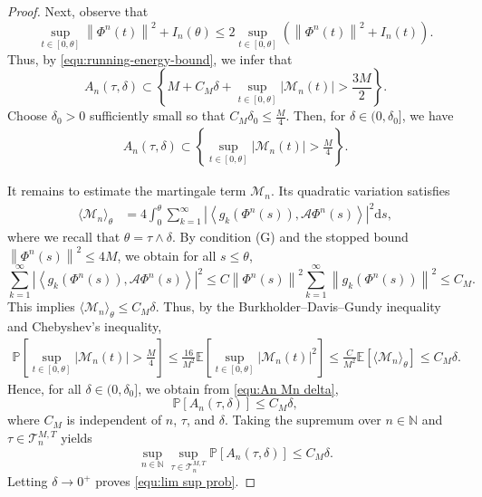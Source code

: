 \documentclass[11pt, reqno]{amsart}
\theoremstyle{definition}
\numberwithin{equation}{section}
\newcommand{\bb}{\mathbb}
\newcommand{\ds}{\mathrm{d}s}
\newcommand{\norm}[1]{\left\|{#1}\right\|}
\newcommand{\inpro}[2]{\left\langle#1,#2\right\rangle}
\newcommand{\abs}[1]{\left|{#1}\right|}
\begin{document}
\begin{proof}
	Next, observe that
	\[
	\sup_{t\in[0,\theta]}\norm{\Phi^n(t)}^2
	+
	I_n(\theta)
	\leq
	2\sup_{t\in[0,\theta]}
	\left(
	\norm{\Phi^n(t)}^2+I_n(t)
	\right).
	\]
	Thus, by \eqref{equ:running-energy-bound}, we infer that
	\[
	A_n(\tau,\delta)
	\subset
	\left\{
	M+C_M\delta
	+
	\sup_{t\in[0,\theta]}\abs{\mathcal M_n(t)}
	>
	\frac{3M}{2}
	\right\}.
	\]
	Choose $\delta_0>0$ sufficiently small so that $C_M\delta_0\leq \frac{M}{4}$.
	Then, for $\delta \in (0,\delta_0]$, we have
	\begin{align}\label{equ:An Mn delta}
	A_n(\tau,\delta)
	\subset
	\left\{
	\sup_{t\in[0,\theta]}\abs{\mathcal M_n(t)}
	>
	\frac{M}{4}
	\right\}.
	\end{align}
	
	It remains to estimate the martingale term $\mathcal{M}_n$. Its quadratic variation satisfies
	\begin{align*}
		\langle \mathcal M_n\rangle_\theta
		&=
		4\int_0^\theta
		\sum_{k=1}^\infty
		\abs{
			\inpro{g_k(\Phi^n(s))}{\mathcal A\Phi^n(s)}
		}^2
		\ds,
	\end{align*}
	where we recall that $\theta=\tau\wedge\delta$.
	By condition {\rm (G)} and the stopped bound $\norm{\Phi^n(s)}^2\leq 4M$, we obtain for all $s\leq\theta$,
	\[
	\sum_{k=1}^\infty
	\abs{
		\inpro{g_k(\Phi^n(s))}{\mathcal A\Phi^n(s)}
	}^2
	\leq
	C\norm{\Phi^n(s)}^2
	\sum_{k=1}^\infty \norm{g_k(\Phi^n(s))}^2
	\leq C_M.
	\]
	This implies $\langle \mathcal M_n\rangle_\theta
	\leq C_M\delta$.
	Thus, by the Burkholder--Davis--Gundy inequality and Chebyshev's inequality,
	\[
	\begin{aligned}
		\bb P\left[
		\sup_{t\in[0,\theta]}
		\abs{\mathcal M_n(t)}
		>
		\frac{M}{4}
		\right]
		\leq
		\frac{16}{M^2}
		\bb E\left[
		\sup_{t\in[0,\theta]}
		\abs{\mathcal M_n(t)}^2
		\right]
		\leq
		\frac{C}{M^2}
		\bb E\left[
		\langle\mathcal M_n\rangle_\theta
		\right]
		\leq
		C_M\delta .
	\end{aligned}
	\]
	Hence, for all $\delta\in (0,\delta_0]$, we obtain from \eqref{equ:An Mn delta},
	\[
	\bb P\left[A_n(\tau,\delta)\right]
	\leq C_M\delta,
	\]
	where $C_M$ is independent of $n$, $\tau$, and $\delta$. Taking the
	supremum over $n\in\bb N$ and $\tau\in\mathcal T_n^{M,T}$ yields
	\[
	\sup_{n\in\bb N}
	\sup_{\tau\in\mathcal T_n^{M,T}}
	\bb P\left[A_n(\tau,\delta)\right]
	\leq C_M\delta .
	\]
	Letting $\delta\to 0^+$ proves \eqref{equ:lim sup prob}.
\end{proof}
\end{document}
